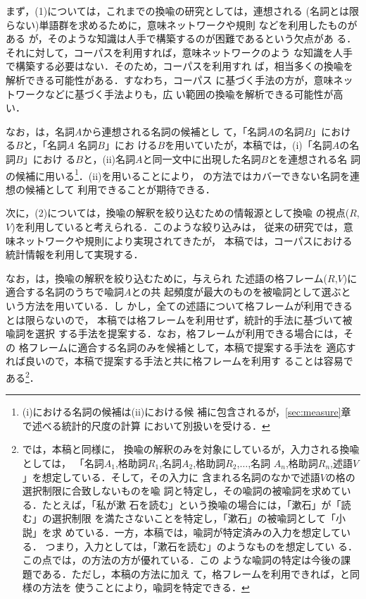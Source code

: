 まず，(1)については，これまでの換喩の研究としては，連想される
(名詞とは限らない)単語群を求めるために，意味ネットワークや規則
などを利用したものがある
\cite{iverson92:_metal,bouaud96:_proces_meton,fass88:_meton_metap}
が，そのような知識は人手で構築するのが困難であるという欠点があ
る．それに対して，コーパスを利用すれば，意味ネットワークのよう
な知識を人手で構築する必要はない．そのため，コーパスを利用すれ
ば，相当多くの換喩を解析できる可能性がある．すなわち，コーパス
に基づく手法の方が，意味ネットワークなどに基づく手法よりも，広
い範囲の換喩を解析できる可能性が高い．

なお，\cite{yamamoto98}は，名詞$A$から連想される名詞の候補とし
て，「名詞$A$の名詞$B$」における$B$と，「名詞$A$ 名詞$B$」にお
ける$B$を用いていたが，本稿では，(i)「名詞$A$の名詞$B$」におけ
る$B$と，(ii)名詞$A$と同一文中に出現した名詞$B$とを連想される名
詞の候補に用いる\footnote{(i)における名詞の候補は(ii)における候
  補に包含されるが，\ref{sec:measure}章で述べる統計的尺度の計算
  において別扱いを受ける．}．(ii)を用いることにより，
\cite{yamamoto98}の方法ではカバーできない名詞を連想の候補として
利用できることが期待できる．

次に，(2)については，換喩の解釈を絞り込むための情報源として換喩
の視点($R$,$V$)を利用していると考えられる．このような絞り込みは，
従来の研究では，意味ネットワークや規則により実現されてきたが，
本稿では，コーパスにおける統計情報を利用して実現する．

なお，\cite{yamamoto98}は，換喩の解釈を絞り込むために，与えられ
た述語の格フレーム($R$,$V$)に適合する名詞のうちで喩詞$A$との共
起頻度が最大のものを被喩詞として選ぶという方法を用いている．し
かし，全ての述語について格フレームが利用できるとは限らないので，
本稿では格フレームを利用せず，統計的手法に基づいて被喩詞を選択
する手法を提案する．なお，格フレームが利用できる場合には，その
格フレームに適合する名詞のみを候補として，本稿で提案する手法を
適応すれば良いので，本稿で提案する手法と共に格フレームを利用す
ることは容易である\footnote{\cite{yamamoto98}では，本稿と同様に，
  換喩の解釈のみを対象にしているが，入力される換喩としては，
  「名詞$A_1$,格助詞$R_1$,名詞$A_2$,格助詞$R_2$,$\ldots$,名詞
  $A_n$,格助詞$R_n$,述語$V$」を想定している．そして，その入力に
  含まれる名詞のなかで述語$V$の格の選択制限に合致しないものを喩
  詞と特定し，その喩詞の被喩詞を求めている．たとえば，「私が漱
  石を読む」という換喩の場合には，「漱石」が「読む」の選択制限
  を満たさないことを特定し，「漱石」の被喩詞として「小説」を求
  めている．一方，本稿では，喩詞が特定済みの入力を想定している．
  つまり，入力としては，「漱石を読む」のようなものを想定してい
  る．この点では，\cite{yamamoto98}の方法の方が優れている．この
  ような喩詞の特定は今後の課題である．ただし，本稿の方法に加え
  て，格フレームを利用できれば，\cite{yamamoto98}と同様の方法を
  使うことにより，喩詞を特定できる．}．

